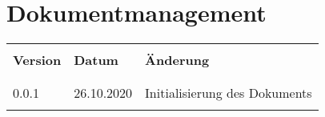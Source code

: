 \chapter*{Dokumentmanagement}

\begin{table}[htp]
  \begin{tabularx}{\textwidth}{l l X}\hline \\
  \textbf{Version} & \textbf{Datum} & \textbf{Änderung} \\ \\\hline \\
  0.0.1 & 26.10.2020 & Initialisierung des Dokuments \\
  \\\hline
  \end{tabularx}
\end{table}
